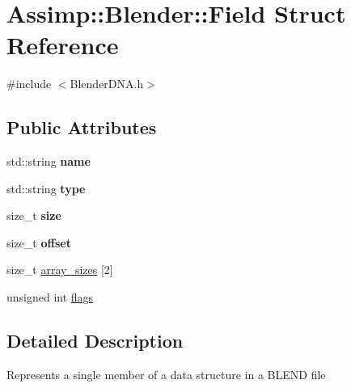 \hypertarget{struct_assimp_1_1_blender_1_1_field}{\section{Assimp\+:\+:Blender\+:\+:Field Struct Reference}
\label{struct_assimp_1_1_blender_1_1_field}
}


{\ttfamily \#include $<$Blender\+D\+N\+A.\+h$>$}

\subsection*{Public Attributes}
\begin{DoxyCompactItemize}
\item 
\hypertarget{struct_assimp_1_1_blender_1_1_field_aab0df45b045fd549ecb058c949f700c5}{std\+::string {\bfseries name}}\label{struct_assimp_1_1_blender_1_1_field_aab0df45b045fd549ecb058c949f700c5}

\item 
\hypertarget{struct_assimp_1_1_blender_1_1_field_a254c698440ee38c9bc7e641f87fb864a}{std\+::string {\bfseries type}}\label{struct_assimp_1_1_blender_1_1_field_a254c698440ee38c9bc7e641f87fb864a}

\item 
\hypertarget{struct_assimp_1_1_blender_1_1_field_a76023045800843c9296d28267a57ed6f}{size\+\_\+t {\bfseries size}}\label{struct_assimp_1_1_blender_1_1_field_a76023045800843c9296d28267a57ed6f}

\item 
\hypertarget{struct_assimp_1_1_blender_1_1_field_a9f8db68d4baad8ed9b24048d9c4a8e4a}{size\+\_\+t {\bfseries offset}}\label{struct_assimp_1_1_blender_1_1_field_a9f8db68d4baad8ed9b24048d9c4a8e4a}

\item 
size\+\_\+t \hyperlink{struct_assimp_1_1_blender_1_1_field_af0e199d5f50faf90e6b5a28f0470a7a2}{array\+\_\+sizes} \mbox{[}2\mbox{]}
\item 
unsigned int \hyperlink{struct_assimp_1_1_blender_1_1_field_ab3e399e13c6b9270c031fa303a5ccd9d}{flags}
\end{DoxyCompactItemize}


\subsection{Detailed Description}
Represents a single member of a data structure in a B\+L\+E\+N\+D file 

